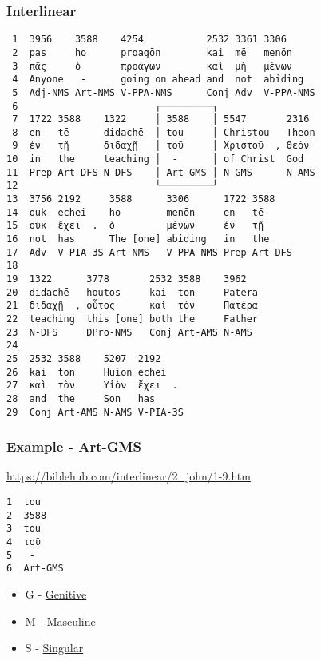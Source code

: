 \documentclass[11pt]{article}
\begin{document}
\subsubsection{Interlinear}
\label{sec:org6fdb697}

\begin{verbatim}
 1  3956    3588    4254           2532 3361 3306
 2  pas     ho      proagōn        kai  mē   menōn
 3  πᾶς     ὁ       προάγων        καὶ  μὴ   μένων
 4  Anyone   -      going on ahead and  not  abiding
 5  Adj-NMS Art-NMS V-PPA-NMS      Conj Adv  V-PPA-NMS
 6                        ┌─────────┐
 7  1722 3588    1322     │ 3588    │ 5547       2316
 8  en   tē      didachē  │ tou     │ Christou   Theon
 9  ἐν   τῇ      διδαχῇ   │ τοῦ     │ Χριστοῦ  , Θεὸν
10  in   the     teaching │  -      │ of Christ  God
11  Prep Art-DFS N-DFS    │ Art-GMS │ N-GMS      N-AMS
12                        └─────────┘
13  3756 2192     3588      3306      1722 3588
14  ouk  echei    ho        menōn     en   tē
15  οὐκ  ἔχει  .  ὁ         μένων     ἐν   τῇ
16  not  has      The [one] abiding   in   the
17  Adv  V-PIA-3S Art-NMS   V-PPA-NMS Prep Art-DFS
18  
19  1322      3778       2532 3588    3962
20  didachē   houtos     kai  ton     Patera
21  διδαχῇ  , οὗτος      καὶ  τὸν     Πατέρα
22  teaching  this [one] both the     Father
23  N-DFS     DPro-NMS   Conj Art-AMS N-AMS
24  
25  2532 3588    5207  2192
26  kai  ton     Huion echei
27  καὶ  τὸν     Υἱὸν  ἔχει  .
28  and  the     Son   has
29  Conj Art-AMS N-AMS V-PIA-3S
\end{verbatim}

\subsubsection{Example - Art-GMS}
\label{sec:org655b794}
\url{https://biblehub.com/interlinear/2\_john/1-9.htm}

\begin{verbatim}
1  tou
2  3588
3  tou
4  τοῦ
5   -
6  Art-GMS
\end{verbatim}

\begin{itemize}
\item G - \href{https://en.wikipedia.org/wiki/Grammatical\_case}{Genitive}
\item M - \href{https://en.wikipedia.org/wiki/Grammatical\_case}{Masculine}
\item S - \href{https://en.wikipedia.org/wiki/Grammatical\_case}{Singular}
\end{itemize}
\end{document}
